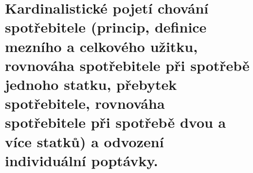 \clearpage
\section{Kardinalistické pojetí chování spotřebitele (princip, definice mezního a celkového
užitku, rovnováha spotřebitele při spotřebě jednoho statku, přebytek spotřebitele,
rovnováha spotřebitele při spotřebě dvou a více statků) a odvození individuální
poptávky.}